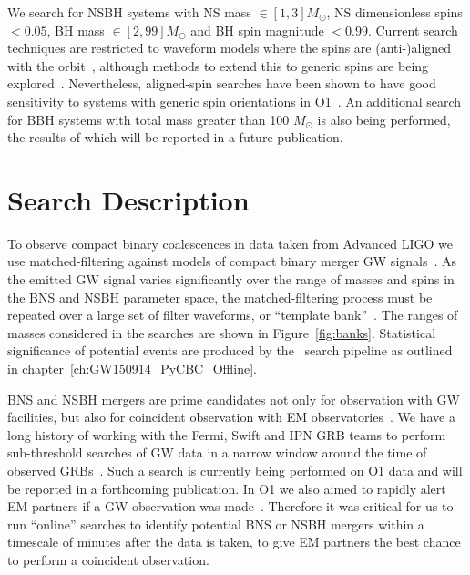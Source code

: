 We search for \ac{NSBH} systems with NS mass
$\in [1,3] M_{\odot}$, NS dimensionless spins $< 0.05$, BH mass $\in [2,99] M_{\odot}$
and BH spin magnitude $< 0.99$. Current search techniques are restricted to
waveform models where the spins are (anti-)aligned with the orbit~\citep{Messick:2016aqy,Usman:2015kfa},
although methods to extend this to generic spins are being explored~\citep{Harry:2016ijz}.
Nevertheless, aligned-spin searches have been shown to have good sensitivity
to systems with generic spin orientations in \ac{O1}~\citep{dal2015impact,Harry:2016ijz}. An
additional search for BBH systems with total mass greater than 100 $M_{\odot}$
is also being performed, the results of which will be reported in a future publication.

\section{Search Description}
\label{sec:search_description}

To observe compact binary coalescences in data taken from Advanced \ac{LIGO} we use
matched-filtering against models of compact binary merger \ac{GW} signals~\citep{Wainstein}.
As the emitted \ac{GW} signal varies significantly over the range of masses and spins
in the \ac{BNS} and \ac{NSBH} parameter space, the matched-filtering process must be repeated
over a large set of filter waveforms, or ``template bank''~\citep{Owen:1998dk}.
The ranges of masses considered in the searches are shown in Figure~\ref{fig:banks}.
Statistical significance of potential events are produced by the \pycbc{}\
search pipeline as outlined in chapter~\ref{ch:GW150914_PyCBC_Offline}. 

\ac{BNS} and \ac{NSBH} mergers are prime candidates not only for observation with
\ac{GW} facilities, but also for coincident observation with \ac{EM}
observatories~\citep{Eichler:1989ve, Hansen:2000am, Narayan:1992iy, Li:1998bw, Nakar:2007yr, Metzger:2011bv, Nakar:2011cw, Berger:2013jza, Zhang:2013lta, Fong:2015oha}.
We have a long history of working with the Fermi, Swift and IPN \ac{GRB} teams
to perform sub-threshold searches of \ac{GW} data in a narrow window around
the time of observed \acp{GRB}~\citep{Abbott:2005yy, Abbott:2007rh, Abadie:2012bz, Briggs:2012ce}.
Such a search is currently being performed on \ac{O1} data and will be reported in a forthcoming
publication.
In \ac{O1} we also aimed to rapidly alert \ac{EM}
partners if a \ac{GW} observation was made~\citep{Abbott:2016gcq}.
Therefore it was critical for us to run ``online'' searches
to identify potential \ac{BNS} or \ac{NSBH} mergers within a timescale of minutes after the data
is taken, to give \ac{EM} partners the best chance to perform a coincident
observation.


